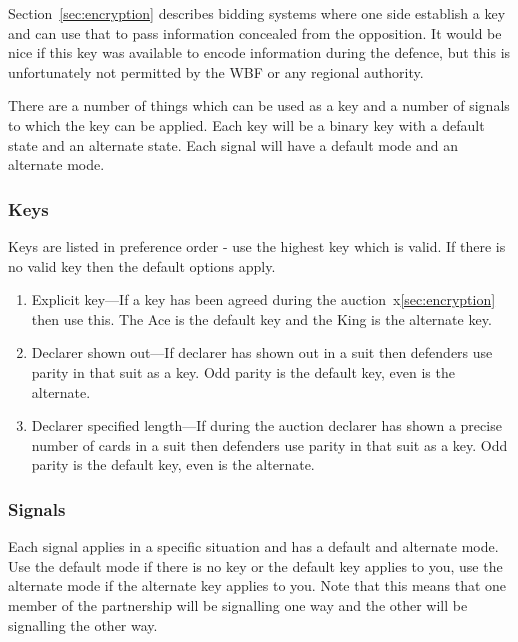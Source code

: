 \documentclass[a4paper,14pt]{extarticle}
\begin{document}
Section~\ref{sec:encryption} describes bidding systems where one side
establish a key and can use that to pass information concealed from the
opposition. It would be nice if this key was available to encode information
during the defence, but this is unfortunately not permitted by the WBF or any
regional authority. 

There are a number of things which can be used as a key and a number of signals
to which the key can be applied. Each key will be a binary key with a default state
and an alternate state. Each signal will have a default mode and an alternate mode.

\subsubsection{Keys}
\label{sec:carding:encrypted:keys}

Keys are listed in preference order - use the highest key which is valid. If
there is no valid key then the default options apply.

\begin{enumerate}

\item Explicit key---If a key has been agreed during the
auction~x\ref{sec:encryption} then use this. The Ace is the default key and the
King is the alternate key.

\item Declarer shown out---If declarer has shown out in a suit then defenders
use parity in that suit as a key. Odd parity is the default key, even is the
alternate.

\item Declarer specified length---If during the auction declarer has shown a
precise number of cards in a suit then defenders use parity in that suit as a
key. Odd parity is the default key, even is the alternate.

\end{enumerate}

\subsubsection{Signals}
\label{sec:carding:encrypted:signals}

Each signal applies in a specific situation and has a default and alternate
mode. Use the default mode if there is no key or the default key applies to
you, use the alternate mode if the alternate key applies to you. Note that this
means that one member of the partnership will be signalling one way and the
other will be signalling the other way.
\end{document}
